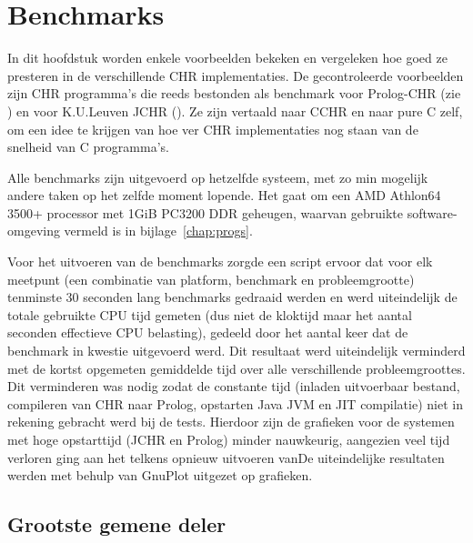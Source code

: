 \chapter{Benchmarks} \label{chap:bench}

\newcommand{\benchfig}[2]{
\begin{figure}[htbp]
\begin{center}
\caption{\label{fig:bench-#1}#2}
\end{center}
\end{figure}
}

In dit hoofdstuk worden enkele voorbeelden bekeken en vergeleken hoe goed ze presteren in de verschillende CHR implementaties. De gecontroleerde voorbeelden zijn CHR programma's die reeds bestonden als benchmark voor Prolog-CHR (zie \cite{tom:benchmarks}) en voor K.U.Leuven JCHR (\cite{peter:benchmarks}). Ze zijn vertaald naar CCHR en naar pure C zelf, om een idee te krijgen van hoe ver CHR implementaties nog staan van de snelheid van C programma's.

Alle benchmarks zijn uitgevoerd op hetzelfde systeem, met zo min mogelijk andere taken op het zelfde moment lopende. Het gaat om een AMD Athlon64 3500+ processor met 1GiB PC3200 DDR geheugen, waarvan gebruikte software-omgeving vermeld is in bijlage~\ref{chap:progs}.

Voor het uitvoeren van de benchmarks zorgde een script ervoor dat voor elk meetpunt (een combinatie van platform, benchmark en probleemgrootte) tenminste 30 seconden lang benchmarks gedraaid werden en werd uiteindelijk de totale gebruikte CPU tijd gemeten (dus niet de kloktijd maar het aantal seconden effectieve CPU belasting), gedeeld door het aantal keer dat de benchmark in kwestie uitgevoerd werd. Dit resultaat werd uiteindelijk verminderd met de kortst opgemeten gemiddelde tijd over alle verschillende probleemgroottes. Dit verminderen was nodig zodat de constante tijd (inladen uitvoerbaar bestand, compileren van CHR naar Prolog, opstarten Java JVM en JIT compilatie) niet in rekening gebracht werd bij de tests. Hierdoor zijn de grafieken voor de systemen met hoge opstarttijd (JCHR en Prolog) minder nauwkeurig, aangezien veel tijd verloren ging aan het telkens opnieuw uitvoeren vanDe uiteindelijke resultaten werden met behulp van GnuPlot uitgezet op grafieken.

\section{Grootste gemene deler} \label{sec:bench-gcd}


